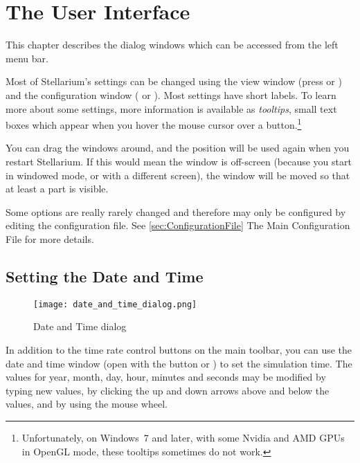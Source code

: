 

\chapter{The User Interface}
\label{ch:gui}


This chapter describes the dialog windows which can be accessed from the left menu bar.

Most of Stellarium's settings can be changed using the view window
(press  or ) and the
configuration window ( or
). Most settings have short labels. To learn more about some
settings, more information is available as \emph{tooltips}, small text
boxes which appear when you hover the mouse cursor over a
button.\footnote{Unfortunately, on Windows~7 and later, with some Nvidia
  and AMD GPUs in OpenGL mode, these tooltips sometimes do not work.}

You can drag the
windows around, and the position will be used again when you restart
Stellarium. If this would mean the window is off-screen (because you
start in windowed mode, or with a different screen), the window will
be moved so that at least a part is visible.

Some options are really rarely changed and therefore may only be
configured by editing the configuration file.  See
\ref{sec:ConfigurationFile} The Main Configuration File for more
details.



\section{Setting the Date and Time}
\label{sec:gui:date}

\begin{figure}[htbp]
\centering\texttt{[image: date\_and\_time\_dialog.png]}
\caption{Date and Time dialog}
\label{fig:gui:date}
\end{figure}

In addition to the time rate control buttons on the main toolbar, you
can use the date and time window (open with the  
button or ) to set the simulation time. The values
for year, month, day, hour, minutes and seconds may be modified by
typing new values, by clicking the up and down arrows above and below
the values, and by using the mouse wheel.

